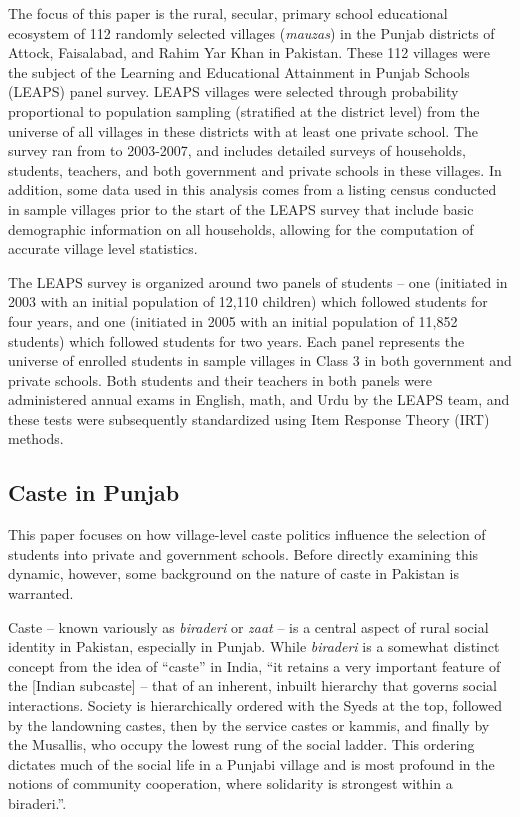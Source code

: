 \documentclass[Eubank_pk_ethnic_sorting.tex]{subfiles}
\begin{document}
The focus of this paper is the rural, secular, primary school educational ecosystem of 112 randomly selected villages (\emph{mauzas}) in the Punjab districts of Attock, Faisalabad, and Rahim Yar Khan in Pakistan. These 112 villages were the subject of the Learning and Educational Attainment in Punjab Schools (LEAPS) panel survey. LEAPS villages were selected through probability proportional to population sampling (stratified at the district level) from the universe of all villages in these districts with at least one private school. The survey ran from to 2003-2007, and includes detailed surveys of households, students, teachers, and both government and private schools in these villages. In addition, some data used in this analysis comes from a listing census conducted in sample villages prior to the start of the LEAPS survey that include basic demographic information on all households, allowing for the computation of accurate village level statistics.

The LEAPS survey is organized around two panels of students -- one (initiated in 2003 with an initial population of 12,110 children) which followed students for four years, and one (initiated in 2005 with an initial population of 11,852 students) which followed students for two years. Each panel represents the universe of enrolled students in sample villages in Class 3 in both government and private schools. Both students and their teachers in both panels were administered annual exams in English, math, and Urdu by the LEAPS team, and these tests were subsequently standardized using Item Response Theory (IRT) methods.

\subsection{Caste in Punjab}\label{caste_in_punjab}

This paper focuses on how village-level caste politics influence the selection of students into private and government schools. Before directly examining this dynamic, however, some background on the nature of caste in Pakistan is warranted.

Caste -- known variously as \emph{biraderi} or \emph{zaat} -- is a central aspect of rural social identity in Pakistan, especially in Punjab. While \emph{biraderi} is a somewhat distinct concept from the idea of ``caste'' in India, ``it retains a very important feature of the [Indian subcaste] -- that of an inherent, inbuilt hierarchy that governs social interactions. Society is hierarchically ordered with the Syeds at the top, followed by the landowning castes, then by the service castes or kammis, and finally by the Musallis, who occupy the lowest rung of the social ladder. This ordering dictates much of the social life in a Punjabi village and is most profound in the notions of community cooperation, where solidarity is strongest within a biraderi.''\citep[p. 29]{Gazdar:2007vt}.
\end{document}
